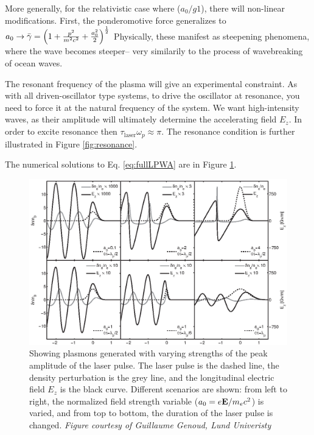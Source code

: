 \documentclass[12pt,letter]{article}
\begin{document}
More generally, for the relativistic case where ($a_0 /g 1$), there will
non-linear modifications. First, the ponderomotive force generalizes to $a_0
\rightarrow \bar{\gamma} = \qty(1 + \frac{p^2}{m^2c^2} + \frac{a_0^2}{2})^\frac{1}{2}$ Physically, these manifest as steepening phenomena,
where the wave becomes steeper-- very similarily to the process of wavebreaking
of ocean waves.

The resonant frequency of the plasma will give an experimental constraint. As
with all driven-oscillator type systems, to drive the oscillator at resonance,
you need to force it at the natural frequency of the system. We want
high-intensity waves, as their amplitude will ultimately determine the
accelerating field $E_z$. In order to excite resonance then $\tau_\textrm{laser}
\omega_p \approx \pi$. The resonance condition is further illustrated in Figure
\ref{fig:resonance}.

The numerical solutions to Eq. \eqref{eq:fullLPWA} are in Figure \ref{fig:plasmon}.
   \begin{figure}[h!]
       \centering
       \includegraphics[width = \linewidth]{../figures/densityandewave.eps}
       \caption{Showing plasmons generated with varying strengths of the peak
       amplitude of the laser pulse.\cite{genothesis}\label{fig:plasmon}
    The laser pulse is the dashed line, the density perturbation is the grey
line, and the longitudinal electric field $E_z$ is the black curve. Different
scenarios are shown: from left to right, the normalized field strength variable
($a_0 = e\vb{E}/m_e c^2$) is varied, and from top to bottom, the duration of
the laser pulse is changed. \em Figure courtesy of Guillaume Genoud, Lund
Univeristy}
   \end{figure}
\end{document}

